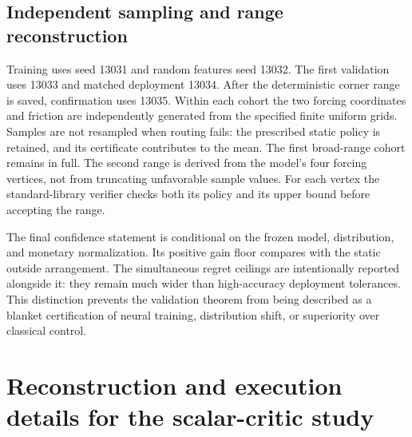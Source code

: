 \documentclass[11pt,letterpaper]{article}
\theoremstyle{definition}
\newcommand{\1}{\mathbf 1}
\begin{document}
\subsection{Independent sampling and range reconstruction}
Training uses seed 13031 and random features seed 13032. The first validation uses 13033 and matched deployment 13034. After the deterministic corner range is saved, confirmation uses 13035. Within each cohort the two forcing coordinates and friction are independently generated from the specified finite uniform grids. Samples are not resampled when routing fails: the prescribed static policy is retained, and its certificate contributes to the mean. The first broad-range cohort remains in full. The second range is derived from the model's four forcing vertices, not from truncating unfavorable sample values. For each vertex the standard-library verifier checks both its policy and its upper bound before accepting the range.

The final confidence statement is conditional on the frozen model, distribution, and monetary normalization. Its positive gain floor compares with the static outside arrangement. The simultaneous regret ceilings are intentionally reported alongside it: they remain much wider than high-accuracy deployment tolerances. This distinction prevents the validation theorem from being described as a blanket certification of neural training, distribution shift, or superiority over classical control.



\section{Reconstruction and execution details for the scalar-critic study}\label{ec:r14-details}
\end{document}

